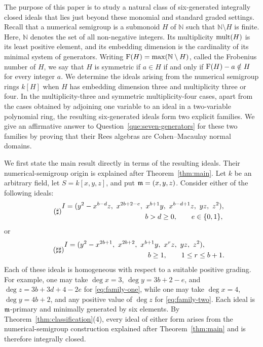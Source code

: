 The purpose of this paper is to study a natural class of six-generated
integrally closed ideals that lies just beyond these monomial and standard
graded settings.  Recall that a numerical semigroup is a submonoid
$H$ of $\mathbb N$ such that $\mathbb N\setminus H$ is finite. Here, $\mathbb{N}$ denotes the set of all non-negative integers.
Its multiplicity $\operatorname{mult}(H)$ is its least positive element, and its embedding
dimension is the cardinality of its minimal system of generators.  Writing
$\operatorname{F}(H)=\max(\mathbb N\setminus H)$, called the Frobenius number of $H$, we say that $H$ is symmetric if
$a \in H$ if and only if $\operatorname{F}(H)-a \notin H$ for every integer $a$.  We
determine the ideals arising from the numerical semigroup rings $k[H]$ when
$H$ has embedding dimension three and multiplicity three or four.  In the
multiplicity-three and symmetric multiplicity-four cases, apart from the
cases obtained by adjoining one variable to an ideal in a two-variable
polynomial ring, the resulting six-generated ideals form two explicit
families.  We give an affirmative answer to
Question~\ref{que:seven-generators} for these two families by proving that
their Rees algebras are Cohen--Macaulay normal domains.

We first state the main result directly in terms of the resulting ideals.
Their numerical-semigroup origin is explained after Theorem~\ref{thm:main}.  Let $k$ be
an arbitrary field, let $S=k[x,y,z]$, and put $\mathfrak m=(x,y,z)$.  Consider either
of the following ideals:
\begin{equation*}\tag{$\sharp$}\label{eq:family-one}
\begin{aligned}
 I={}&(y^2-x^{b-d}z,\ x^{2b+2-e},\ x^{b+1}y,\
        x^{b-d+1}z,\ yz,\ z^2),\\
 &\hspace{35mm} b>d\geq0,\qquad e\in\{0,1\},
\end{aligned}
\end{equation*}
or
\begin{equation*}\tag{$\sharp\sharp$}\label{eq:family-two}
\begin{aligned}
 I={}&(y^2-x^{2b+1},\ x^{2b+2},\ x^{b+1}y,\ x^rz,\ yz,\ z^2),\\
 &\hspace{35mm} b\geq1,\qquad 1\leq r\leq b+1.
\end{aligned}
\end{equation*}
Each of these ideals is homogeneous with respect to a suitable positive
grading.  For example, one may take $\deg x=3$, $\deg y=3b+2-e$, and
$\deg z=3b+3d+4-2e$ for \eqref{eq:family-one}, while one may take
$\deg x=4$, $\deg y=4b+2$, and any positive value of $\deg z$ for
\eqref{eq:family-two}.  Each ideal is $\mathfrak m$-primary and minimally generated
by six elements.  By
Theorem~\ref{thm:classification}(4), every ideal of either form arises from
the numerical-semigroup construction explained after Theorem~\ref{thm:main}
and is therefore integrally closed.


